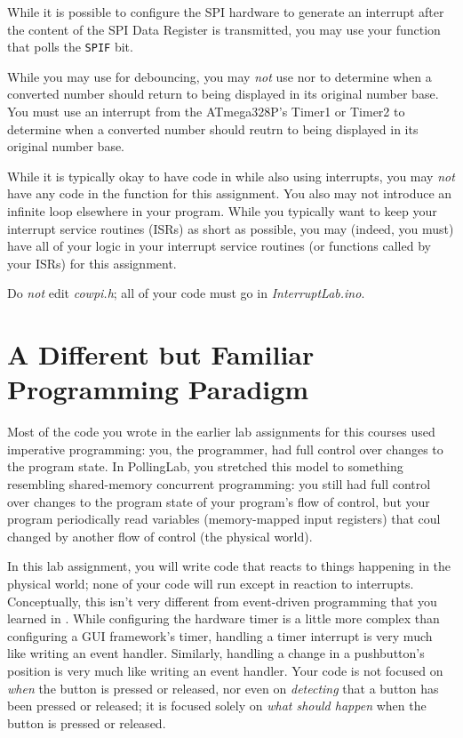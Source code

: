 While it is possible to configure the SPI hardware to generate an interrupt
after the content of the SPI Data Register is transmitted, you may use your
 function that polls the \texttt{SPIF} bit.

While you may use  for debouncing, you may \textit{not} use
 nor  to determine when a converted number
should return to being displayed in its original number base. You must use an
interrupt from the ATmega328P's Timer1 or Timer2 to determine when a converted
number should reutrn to being displayed in its original number base.

While it is typically okay to have code in  while also using
interrupts, you may \textit{not} have any code in the 
function for this assignment. You also may not introduce an infinite loop
elsewhere in your program. While you typically want to keep your interrupt
service routines (ISRs) as short as possible, you may (indeed, you must) have
all of your logic in your interrupt service routines (or functions called by
your ISRs) for this assignment.

Do \textit{not} edit \textit{cowpi.h}; all of your code must go in
\textit{InterruptLab.ino}.

\section{A Different but Familiar Programming Paradigm} \label{sec:Paradigm}

Most of the code you wrote in the earlier lab assignments for this courses used
imperative programming: you, the programmer, had full control over changes to
the program state. In PollingLab, you stretched this model to something
resembling shared-memory concurrent programming: you still had full control
over changes to the program state of your program's flow of control, but your
program periodically read variables (memory-mapped input registers) that coul
changed by another flow of control (the physical world).

In this lab assignment, you will write code that reacts to things happening in
the physical world; none of your code will run except in reaction to interrupts.
Conceptually, this isn't very different from event-driven programming that you
learned in \cstwo. While configuring the hardware timer is a little more complex
than configuring a GUI framework's timer, handling a timer interrupt is very
much like writing an  event handler. Similarly, handling
a change in a pushbutton's position is very much like writing an
 event handler. Your code is not focused on \textit{when}
the button is pressed or released, nor even on \textit{detecting} that a button
has been pressed or released; it is focused solely on \textit{what should happen}
when the button is pressed or released.


